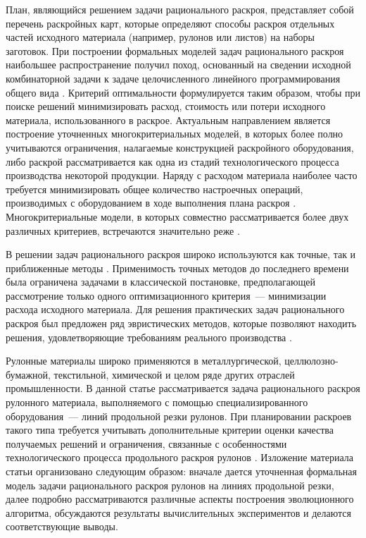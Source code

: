\documentclass[12pt]{article}
\begin{document}
План, являющийся решением задачи рационального раскроя, представляет собой 
перечень раскройных карт, которые определяют способы раскроя отдельных частей 
исходного материала (например, рулонов или листов) на наборы заготовок. При 
построении формальных моделей задач рационального раскроя наибольшее 
распространение получил поход, основанный на сведении исходной комбинаторной 
задачи к задаче целочисленного линейного программирования общего вида 
\cite{decarvalho02}. 
Критерий оптимальности формулируется таким образом, чтобы при поиске решений 
минимизировать расход, стоимость или потери исходного материала, 
использованного в раскрое. Актуальным направлением является построение 
уточненных многокритериальных моделей, в которых более полно учитываются 
ограничения, налагаемые конструкцией раскройного оборудования, либо раскрой 
рассматривается как одна из стадий технологического процесса производства 
некоторой продукции. Наряду с расходом материала наиболее часто требуется 
минимизировать общее количество настроечных операций, производимых с 
оборудованием в ходе выполнения плана раскроя 
\cite{haessler88, foerster00}. 
Многокритериальные 
модели, в которых совместно рассматривается более двух различных критериев, 
встречаются значительно реже 
\cite{belov07}.

В решении задач рационального раскроя широко используются как точные, так и 
приближенные методы 
\cite{haessler91, golovistikov08}. 
Применимость точных методов до последнего времени 
была ограничена задачами в классической постановке, предполагающей рассмотрение 
только одного оптимизационного критерия~--- минимизации расхода исходного 
материала. Для решения практических задач рационального раскроя был предложен 
ряд эвристических методов, которые позволяют находить решения, удовлетворяющие 
требованиям реального производства 
\cite{haessler88, goulimis90, vahrenkamp96, song06, golfeto09, huang09}.

Рулонные материалы широко применяются в металлургической, целлюлозно-бумажной, 
текстильной, химической и целом ряде других отраслей промышленности. В данной 
статье рассматривается задача рационального раскроя рулонного материала, 
выполняемого с помощью специализированного оборудования~--- линий продольной 
резки рулонов. При планировании раскроев такого типа требуется учитывать 
дополнительные критерии оценки качества получаемых решений и ограничения, 
связанные с особенностями технологического процесса продольного раскроя 
рулонов 
\cite{haessler88, song06}. 
Изложение материала статьи организовано следующим образом: 
вначале дается уточненная формальная модель задачи рационального раскроя 
рулонов на линиях продольной резки, далее подробно рассматриваются различные 
аспекты построения эволюционного алгоритма, обсуждаются результаты 
вычислительных экспериментов и делаются соответствующие выводы.
\end{document}
